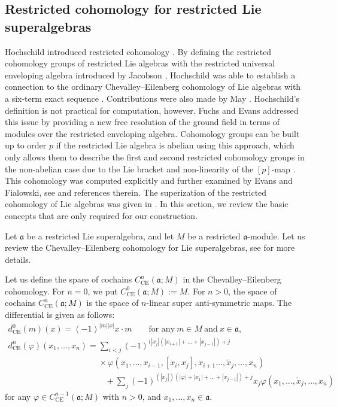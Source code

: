 \documentclass[pdftex]{sigma}
\numberwithin{equation}{section}
\begin{document}
\subsection{Restricted cohomology for restricted Lie superalgebras}
Hochschild introduced restricted cohomology \cite{H}. By defining the restricted cohomology groups of restricted Lie algebras with the restricted universal enveloping algebra introduced by Jacobson \cite{J}, Hochschild was able to establish a connection to the ordinary Chevalley--Eilenberg cohomology of Lie algebras with a six-term exact sequence \cite{H}. Contributions were also made by May \cite{M}. Hochschild's definition is not practical for computation, however.
Fuchs and Evans addressed this issue by providing a new free resolution of the ground field in terms of modules over the restricted enveloping algebra. Cohomology groups can be built up to order $p$ if the restricted Lie algebra is abelian using this approach, which only allows them to describe the first and second restricted cohomology groups in the non-abelian case due to the Lie bracket and non-linearity of the $[p]$-map \cite{EF}. This cohomology was computed explicitly and further examined by Evans and Fialowski, see \cite{EF4, EF5} and references therein. The superization of the restricted cohomology of Lie algebras was given in \cite{YCC}. In this section, we review the basic concepts that are only required for our construction.

Let $\mathfrak{a}$ be a restricted Lie superalgebra, and let $M$ be a restricted $\mathfrak{a}$-module. Let us review the Chevalley--Eilenberg cohomology for Lie superalgebras, see \cite{BGL} for more details.

Let us define the space of cochains $C^n_{\text{CE}}(\mathfrak{a}; M)$ in the Chevalley--Eilenberg cohomology. For ${n=0}$, we put $C^0_{\text{CE}}(\mathfrak{a}; M):=M$. For $n>0$, the space of cochains $C^n_{\text{CE}}(\mathfrak{a}; M)$ is the space of $n$-linear super anti-symmetric maps. The differential is given as follows:
\begin{gather*}
 d_{\mathrm{CE}}^0(m)(x)=(-1)^{|m||x|}x\cdot m\qquad\text{for any}\ m\in M\ \text{and} \ x\in\mathfrak{a},\\
d_{\mathrm{CE}}^n(\varphi)(x_1,\dots, x_n) = \mathop{\sum}\limits_{i<j}(-1)^{(|x_j|(|x_{i+1}|+\dots+|x_{j-1}|)+j}\\
\phantom{d_{\mathrm{CE}}^n(\varphi)(x_1,\dots, x_n) =}{}\times\varphi(x_1, \dots, x_{i-1}, [x_i,x_j], x_{i+1} \dots, \widetilde x_j, \dots, x_n)\\
\phantom{d_{\mathrm{CE}}^n(\varphi)(x_1,\dots, x_n) =\times}{}+\mathop{\sum}\limits_{j}(-1)^{(|x_j|)(|\varphi|+|x_{1}|+\dots+|x_{j-1}|)+j}x_j  \varphi (x_1, \dots, \widetilde x_j, \dots, x_n)
\end{gather*}
for any $\varphi \in C^{n-1}_{\text{CE}}(\mathfrak{a}; M)$ with $n>0$, and $x_1,\dots, x_n\in\mathfrak{a}$.
\end{document}
